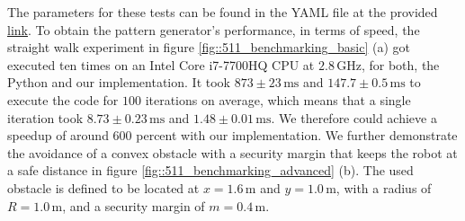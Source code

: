 The parameters for these tests can be found in the YAML file at the provided \href{https://github.com/mhubii/nmpc_pattern_generator/blob/719fde0bb73925923de85cbf379c5523e075dfeb/libs/pattern_generator/configs_hrp2.yaml#L1}{link}. To obtain the pattern generator's performance, in terms of speed, the straight walk experiment in figure \ref{fig::511_benchmarking_basic} (a) got executed ten times on an Intel Core i7-7700HQ CPU at $2.8\,\text{GHz}$, for both, the Python and our implementation. It took $873\pm23\,\text{ms}$ and $147.7\pm0.5\,\text{ms}$ to execute the code for $100$ iterations on average, which means that a single iteration took $8.73\pm0.23\,\text{ms}$ and $1.48\pm0.01\,\text{ms}$. We therefore could achieve a speedup of around $600$ percent with our implementation. We further demonstrate the avoidance of a convex obstacle with a security margin that keeps the robot at a safe distance in figure \ref{fig::511_benchmarking_advanced} (b). The used obstacle is defined to be located at $x=1.6\,\text{m}$ and $y=1.0\,\text{m}$, with a radius of $R=1.0\,\text{m}$, and a security margin of $m=0.4\,\text{m}$.
